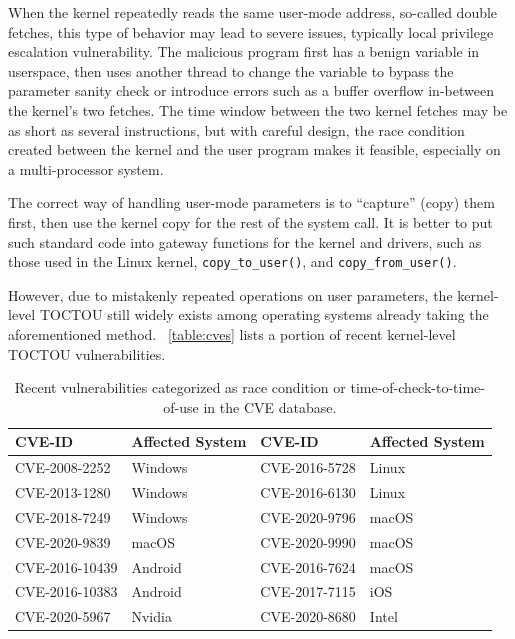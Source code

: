 When the kernel repeatedly reads the same user-mode address, so-called double fetches, this type of behavior may lead to severe issues, typically local privilege escalation vulnerability. The malicious program first has a benign variable in userspace, then uses another thread to change the variable to bypass the parameter sanity check or introduce errors such as a buffer overflow in-between the kernel's two fetches. The time window between the two kernel fetches may be as short as several instructions,  but with careful design, the race condition created between the kernel and the user program makes it feasible, especially on a multi-processor system.



The correct way of handling user-mode parameters is to ``capture'' (copy) them first, then use the kernel copy for the rest of the system call. It is better to put such standard code into gateway functions for the kernel and drivers, such as those used in the Linux kernel, \texttt{copy\_to\_user()}, and \texttt{copy\_from\_user()}.

However, due to mistakenly repeated operations on user parameters, the kernel-level TOCTOU still widely exists among operating systems already taking the aforementioned method. ~\autoref{table:cves} lists a portion of recent kernel-level TOCTOU vulnerabilities.

\begin{center}
\begin{table}[ht]
\small
\caption{Recent vulnerabilities categorized as race condition or time-of-check-to-time-of-use in the CVE database.}
\label{table:cves}
\centering
	\begin{tabular}{@{}>{\raggedright\arraybackslash}m{2.35cm}@{}|
			@{}>{\centering\arraybackslash}m{1.35cm}@{}|
			@{}>{\centering\arraybackslash}m{2.35cm}@{}|
			@{}>{\centering\arraybackslash}m{1.25cm}@{} } 
\hline
CVE-ID & Affected System & CVE-ID & Affected System \\ %
\hline
CVE-2008-2252  & Windows & CVE-2016-5728 & Linux \\
CVE-2013-1280  & Windows & CVE-2016-6130 & Linux \\
CVE-2018-7249  & Windows & CVE-2020-9796 & macOS \\ 
CVE-2020-9839  & macOS   & CVE-2020-9990 & macOS \\
CVE-2016-10439 & Android & CVE-2016-7624 & macOS \\
CVE-2016-10383 & Android & CVE-2017-7115 & iOS \\

CVE-2020-5967  & Nvidia  & CVE-2020-8680 & Intel \\
\hline

\end{tabular}
\end{table}
\end{center}



